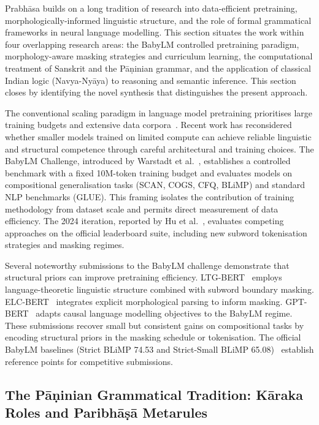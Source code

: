 
Prabhāsa builds on a long tradition of research into data-efficient pretraining, morphologically-informed linguistic structure, and the role of formal grammatical frameworks in neural language modelling. This section situates the work within four overlapping research areas: the BabyLM controlled pretraining paradigm, morphology-aware masking strategies and curriculum learning, the computational treatment of Sanskrit and the Pāṇinian grammar, and the application of classical Indian logic (Navya-Nyāya) to reasoning and semantic inference. This section closes by identifying the novel synthesis that distinguishes the present approach.

The conventional scaling paradigm in language model pretraining prioritises large training budgets and extensive data corpora~\cite{Kaplan2020}. Recent work has reconsidered whether smaller models trained on limited compute can achieve reliable linguistic and structural competence through careful architectural and training choices. The BabyLM Challenge, introduced by Warstadt et al.~\cite{Warstadt2023}, establishes a controlled benchmark with a fixed 10M-token training budget and evaluates models on compositional generalisation tasks (SCAN, COGS, CFQ, BLiMP) and standard NLP benchmarks (GLUE). This framing isolates the contribution of training methodology from dataset scale and permits direct measurement of data efficiency. The 2024 iteration, reported by Hu et al.~\cite{Hu2024BabyLM}, evaluates competing approaches on the official leaderboard suite, including new subword tokenisation strategies and masking regimes.

Several noteworthy submissions to the BabyLM challenge demonstrate that structural priors can improve pretraining efficiency. LTG-BERT~\cite{Samuel2023LTG} employs language-theoretic linguistic structure combined with subword boundary masking. ELC-BERT~\cite{CharpentierSamuel2023} integrates explicit morphological parsing to inform masking. GPT-BERT~\cite{CharpentierSamuel2024} adapts causal language modelling objectives to the BabyLM regime. These submissions recover small but consistent gains on compositional tasks by encoding structural priors in the masking schedule or tokenisation. The official BabyLM baselines (Strict BLiMP 74.53 and Strict-Small BLiMP 65.08)~\cite{Hu2024BabyLM} establish reference points for competitive submissions.

\subsection{The Pāṇinian Grammatical Tradition: Kāraka Roles and Paribhāṣā Metarules}

